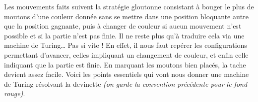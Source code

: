 \begin{center}
\vspace{.75em} %

\emptybox\emptybox%
	\wboxedW%
	\nboxedW%
	\fboxedB%
	\boxit{$\times$}%
	\wboxedB%
	\wboxedB%
\emptybox\emptybox


\vspace{.75em} %

\emptybox\emptybox%
	\wboxedW%
	\wboxedW%
	\boxit{$\times$}%
	\nboxedB%
	\wboxedB%
	\wboxedB%
\emptybox\emptybox


\vspace{.75em} %

\emptybox\emptybox%
	\wboxedW%
	\wboxedW%
	\boxit{$\times$}%
	\wboxedB%
	\wboxedB%
	\wboxedB%
\emptybox\emptybox

\end{center}


Les mouvements faits suivent la stratégie gloutonne consistant à bouger le plus de moutons d'une couleur donnée sans se mettre dans une position bloquante autre que la position gagnante, puis à changer de couleur si aucun mouvement n'est possible et si la partie n'est pas finie. Il ne reste plus qu'à traduire cela via une machine de Turing\dots
Pas si vite ! En effet, il nous faut repérer les configurations permettant d'avancer, celles impliquant un changement de couleur, et enfin celle indiquant que la partie est finie.
En marquant les moutons bien placés, la tache devient assez facile. Voici les points essentiels qui vont nous donner une machine de Turing résolvant la devinette \emph{(on garde la convention précédente pour le fond rouge)}.

